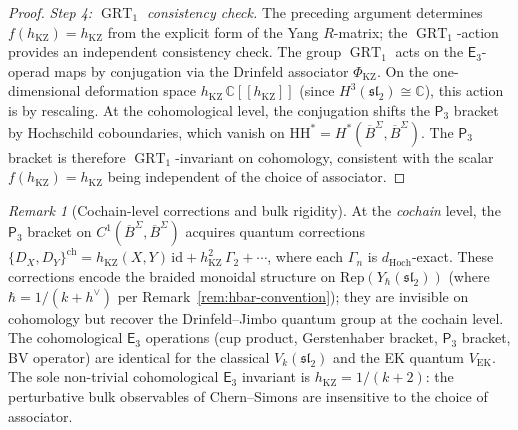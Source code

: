 \documentclass[11pt,reqno]{amsart}
\theoremstyle{definition}
\theoremstyle{remark}
\newtheorem{remark}[theorem]{Remark}
\newcommand{\HH}{\mathrm{HH}}
\newcommand{\Ethree}{\mathsf{E}_{3}}
\newcommand{\Pthree}{\mathsf{P}_{3}}
\DeclareMathOperator{\GRT}{GRT}
\newcommand{\BarSig}{\overline{B}^{\Sigma}}
\newcommand{\CC}{\mathbb{C}}
\newcommand{\id}{\mathrm{id}}
\numberwithin{equation}{section}
\begin{document}
\begin{proof}
\textit{Step 4: $\GRT_1$ consistency check.}
The preceding argument determines
$f(h_{\mathrm{KZ}}) = h_{\mathrm{KZ}}$
from the explicit form of the Yang $R$-matrix; the
$\GRT_1$-action provides an independent consistency
check. The group $\GRT_1$ acts on the
$\Ethree$-operad maps by conjugation via the
Drinfeld associator $\Phi_{\mathrm{KZ}}$. On the
one-dimensional deformation space
$h_{\mathrm{KZ}}\,\CC[[h_{\mathrm{KZ}}]]$ (since
$H^3(\mathfrak{sl}_2) \cong \CC$), this action is
by rescaling. At the cohomological level, the
conjugation shifts the $\Pthree$ bracket by
Hochschild coboundaries, which vanish on
$\HH^* = H^*(\BarSig, \BarSig)$. The $\Pthree$
bracket is therefore $\GRT_1$-invariant on
cohomology, consistent with the scalar
$f(h_{\mathrm{KZ}}) = h_{\mathrm{KZ}}$ being
independent of the choice of associator.
\end{proof}

\begin{remark}[Cochain-level corrections and bulk rigidity]
\label{rem:ek-cochain-corrections}
\label{rem:ek-bulk-rigidity}
At the \emph{cochain} level, the $\Pthree$ bracket on
$C^1(\BarSig, \BarSig)$ acquires quantum corrections
$\{D_X, D_Y\}^{\mathrm{ch}}
= h_{\mathrm{KZ}}(X,Y)\,\id
+ h_{\mathrm{KZ}}^2\,\Gamma_2 + \cdots$,
where each $\Gamma_n$ is $d_{\mathrm{Hoch}}$-exact. These
corrections encode the braided monoidal structure on
$\mathrm{Rep}(Y_\hbar(\mathfrak{sl}_2))$
(where $\hbar = 1/(k + h^\vee)$ per
Remark~\ref{rem:hbar-convention}); they are invisible
on cohomology but recover the Drinfeld--Jimbo quantum group
at the cochain level. The cohomological $\Ethree$ operations
(cup product, Gerstenhaber bracket, $\Pthree$ bracket, BV
operator) are identical for the classical $V_k(\mathfrak{sl}_2)$
and the EK quantum $V_{\mathrm{EK}}$. The sole non-trivial
cohomological $\Ethree$ invariant is
$h_{\mathrm{KZ}} = 1/(k+2)$: the perturbative bulk
observables of Chern--Simons are insensitive to the choice
of associator.
\end{remark}
\end{document}
